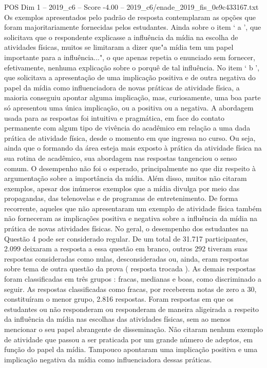 \begin{textsample}{POS Dim 1 – 2019\_c6 – Score -4.00 – 2019\_c6/enade\_2019\_fis\_0e9c433167.txt}
Os exemplos apresentados pelo padrão de resposta contemplaram as opções que foram majoritariamente fornecidas pelos estudantes.
Ainda sobre o item ‘ a ’, que solicitava que o respondente explicasse a influência da mídia na escolha de atividades físicas, muitos se limitaram a dizer que"a mídia tem um papel importante para a influência...", o que apenas repetia o enunciado sem fornecer, efetivamente, nenhuma explicação sobre o porquê de tal influência.
No item ‘ b ’, que solicitava a apresentação de uma implicação positiva e de outra negativa do papel da mídia como influenciadora de novas práticas de atividade física, a maioria conseguiu apontar alguma implicação, mas, curiosamente, uma boa parte só apresentou uma única implicação, ou a positiva ou a negativa.
A abordagem usada para as respostas foi intuitiva e pragmática, em face do contato permanente com algum tipo de vivência do acadêmico em relação a uma dada prática de atividade física, desde o momento em que ingressa no curso.
Ou seja, ainda que o formando da área esteja mais exposto à prática da atividade física na sua rotina de acadêmico, sua abordagem nas respostas tangenciou o senso comum.
O desempenho não foi o esperado, principalmente no que diz respeito à argumentação sobre a importância da mídia.
Além disso, muitos não citaram exemplos, apesar dos inúmeros exemplos que a mídia divulga por meio das propagandas, das telenovelas e de programas de entretenimento.
De forma recorrente, aqueles que não apresentaram um exemplo de atividade física também não forneceram as implicações positiva e negativa sobre a influência da mídia na prática de novas atividades físicas.
No geral, o desempenho dos estudantes na Questão 4 pode ser considerado regular.
De um total de 31.717 participantes, 2.099 deixaram a resposta a essa questão em branco, outros 292 tiveram suas respostas consideradas como nulas, desconsideradas ou, ainda, eram respostas sobre tema de outra questão da prova ( resposta trocada ).
As demais respostas foram classificadas em três grupos : fracas, medianas e boas, como discriminado a seguir.
As respostas classificadas como fracas, por receberem notas de zero a 30, constituíram o menor grupo, 2.816 respostas.
Foram respostas em que os estudantes ou não responderam ou responderam de maneira aligeirada a respeito da influência da mídia nas escolhas das atividades físicas, sem ao menos mencionar o seu papel abrangente de disseminação.
Não citaram nenhum exemplo de atividade que passou a ser praticada por um grande número de adeptos, em função do papel da mídia.
Tampouco apontaram uma implicação positiva e uma implicação negativa da mídia como influenciadora dessas práticas.

\end{textsample}
